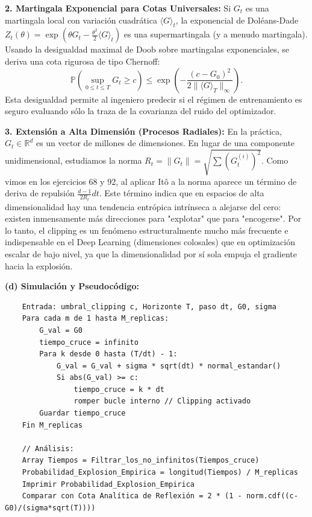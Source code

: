 \documentclass[11pt, letterpaper]{article}
\begin{document}
\begin{solucion}
    \textbf{2. Martingala Exponencial para Cotas Universales:}
    Si $G_t$ es una martingala local con variación cuadrática $\langle G \rangle_t$, la exponencial de Doléans-Dade $Z_t(\theta) = \exp(\theta G_t - \frac{\theta^2}{2}\langle G \rangle_t)$ es una supermartingala (y a menudo martingala).
    Usando la desigualdad maximal de Doob sobre martingalas exponenciales, se deriva una cota rigurosa de tipo Chernoff:
    \[ \mathbb{P}\left( \sup_{0 \le t \le T} G_t \ge c \right) \le \exp\left( -\frac{(c - G_0)^2}{2 \|\langle G \rangle_T\|_{\infty}} \right). \]
    Esta desigualdad permite al ingeniero predecir si el régimen de entrenamiento es seguro evaluando sólo la traza de la covarianza del ruido del optimizador.

    \textbf{3. Extensión a Alta Dimensión (Procesos Radiales):}
    En la práctica, $G_t \in \mathbb{R}^d$ es un vector de millones de dimensiones. En lugar de una componente unidimensional, estudiamos la norma $R_t = \|G_t\| = \sqrt{\sum (G_t^{(i)})^2}$.
    Como vimos en los ejercicios 68 y 92, al aplicar Itô a la norma aparece un término de deriva de repulsión $\frac{d-1}{2 R_t} dt$.
    Este término indica que en espacios de alta dimensionalidad hay una tendencia entrópica intrínseca a alejarse del cero: existen inmensamente más direcciones para "explotar" que para "encogerse". Por lo tanto, el clipping es un fenómeno estructuralmente mucho más frecuente e indispensable en el Deep Learning (dimensiones colosales) que en optimización escalar de bajo nivel, ya que la dimensionalidad por sí sola empuja el gradiente hacia la explosión.

    \textbf{(d) Simulación y Pseudocódigo:}
    \begin{verbatim}
    Entrada: umbral_clipping c, Horizonte T, paso dt, G0, sigma
    Para cada m de 1 hasta M_replicas:
        G_val = G0
        tiempo_cruce = infinito
        Para k desde 0 hasta (T/dt) - 1:
            G_val = G_val + sigma * sqrt(dt) * normal_estandar()
            Si abs(G_val) >= c:
                tiempo_cruce = k * dt
                romper bucle interno // Clipping activado
        Guardar tiempo_cruce
    Fin M_replicas
    
    // Análisis:
    Array Tiempos = Filtrar_los_no_infinitos(Tiempos_cruce)
    Probabilidad_Explosion_Empirica = longitud(Tiempos) / M_replicas
    Imprimir Probabilidad_Explosion_Empirica
    Comparar con Cota Analítica de Reflexión = 2 * (1 - norm.cdf((c-G0)/(sigma*sqrt(T))))
    \end{verbatim}
\end{solucion}
\end{document}
